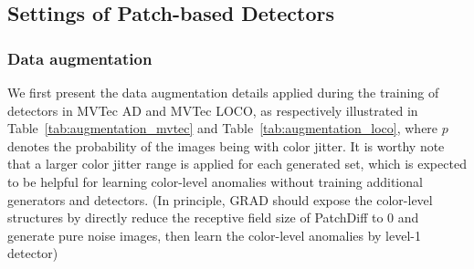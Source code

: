 \subsection{Settings of Patch-based Detectors}
\subsubsection{Data augmentation}
We first present the data augmentation details applied during the training of detectors in MVTec AD and MVTec LOCO, as respectively illustrated in Table~\ref{tab:augmentation_mvtec} and Table~\ref{tab:augmentation_loco}, where $p$ denotes the probability of the images being with color jitter. It is worthy note that a larger color jitter range is applied for each generated set, which is expected to be helpful for learning color-level anomalies without training additional generators and detectors. (In principle, GRAD should expose the color-level structures by directly reduce the receptive field size of PatchDiff to 0 and generate pure noise images, then learn the color-level anomalies by level-1 detector)

